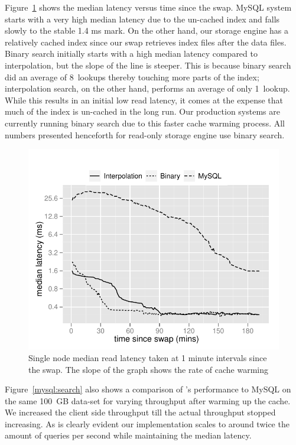 Figure~\ref{search} shows the median latency versus time since the swap.
MySQL system starts with a very high median latency due to the un-cached
index and falls slowly to the stable 1.4 ms mark. On the other hand, our
storage engine has a relatively cached index since our swap retrieves index
files after the data files. Binary search initially starts with a high 
median latency compared to interpolation, but the slope of the line 
is steeper. This is because binary search did an average of 8~lookups 
thereby touching more parts of the index; interpolation search, on the 
other hand, performs an average of only 1~lookup. While this results 
in an initial low read latency, it comes at the expense that much of the 
index is un-cached in the long run. Our production systems are currently 
running binary search due to this faster cache warming process. All numbers 
presented henceforth for read-only storage engine use binary search.  

\begin{figure}
  \centering
    \includegraphics[scale=0.55]{images/search_1node.pdf}
  \caption{Single node median read latency taken at 1 minute intervals since the swap. The slope of the graph shows the rate of cache warming}
  \label{search}
\end{figure}

\newpage
Figure~\ref{mysql:search} also shows a comparison of \projectname's
performance to MySQL on the same 100~GB data-set for varying 
throughput after warming up the cache. We increased the client 
side throughput till the actual throughput stopped increasing. 
As is clearly evident our implementation scales to around twice
the amount of queries per second while maintaining the median latency. 

